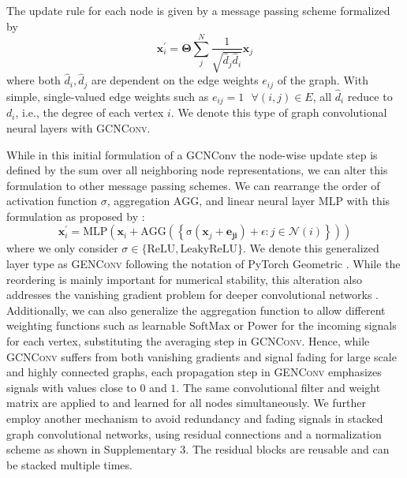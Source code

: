 \documentclass[]{article}
\renewcommand{\cite}{\citep}
\begin{document}
The update rule for each node is given by a message passing scheme
formalized by
\begin{equation}
	\mathbf{x}^{\prime}_i = \mathbf{\Theta} \sum^{N}_{j}
	\frac{1}{\sqrt{\hat{d}_j \hat{d}_i}} \mathbf{x}_j
\end{equation}
where both $\hat{d}_i, \hat{d}_j$ are dependent on the edge weights
$e_{ij}$ of the graph. With simple, single-valued edge weights such as
$e_{ij}=1 \text{ }\forall (i,j)\in E$, all $\hat{d}_i$ reduce to
$d_i$, i.e., the degree of each vertex $i$. We denote this type of
graph convolutional neural layers with \textsc{GCNConv}.

While in this initial formulation of a GCNConv the node-wise update
step is defined by the sum over all neighboring node representations,
we can alter this formulation to other message passing schemes.  We
can rearrange the order of activation function $\sigma$, aggregation
$\mathrm{AGG}$, and linear neural layer $\mathrm{MLP}$ with this
formulation as proposed by \cite{GENConv2020}:
\begin{equation}
	\mathbf{x}_i^{\prime} = \mathrm{MLP} \left( \mathbf{x}_i +
	\mathrm{AGG} \left( \left\{
	\mathrm{\sigma} \left( \mathbf{x}_j + \mathbf{e_{ji}} \right) +\epsilon
	: j \in \mathcal{N}(i) \right\} \right)
	\right)
\end{equation}
where we only consider
$\sigma \in \{\mathrm{ReLU}, \mathrm{LeakyReLU}\}$. We denote this
generalized layer type as \textsc{GENConv} following the notation of
PyTorch Geometric \cite{PytorchGeometric}.  While the reordering is
mainly important for numerical stability, this alteration also addresses
the vanishing gradient problem for deeper convolutional networks
\cite{GENConv2020}. Additionally, we can also generalize the
aggregation function to allow different weighting functions such as
learnable $\mathrm{SoftMax}$ or $\mathrm{Power}$ for the incoming
signals for each vertex, substituting the averaging step in
\textsc{GCNConv}. Hence, while \textsc{GCNConv} suffers from both
vanishing gradients and signal fading for large scale and highly
connected graphs, each propagation step in \textsc{GENConv} emphasizes
signals with values close to $0$ and $1$. The same convolutional
filter and weight matrix are applied to and learned for all nodes
simultaneously. %
We further employ another mechanism to avoid redundancy and fading
signals in stacked graph convolutional networks, using residual
connections and a normalization scheme \cite{DeepGCN2019}
	\cite{GENConv2020} as shown in Supplementary 3.  The residual
blocks are reusable and can be stacked multiple times.
\end{document}
